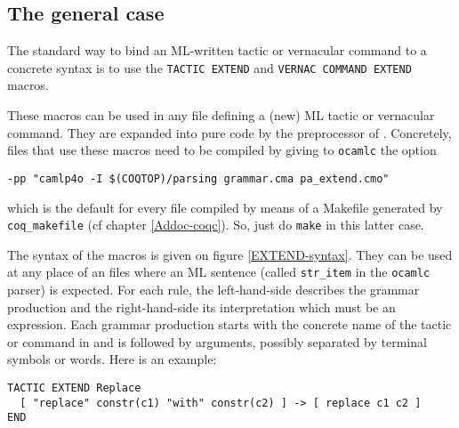 \subsection{The general case}

The standard way to bind an ML-written tactic or vernacular command to
a concrete {\Coq} syntax is to use the
\verb=TACTIC EXTEND= and \verb=VERNAC COMMAND EXTEND= macros.

These macros can be used in any {\ocaml} file defining a (new) ML tactic
or vernacular command. They are expanded into pure {\ocaml} code by
the {\camlpppp} preprocessor of {\ocaml}. Concretely, files that use
these macros need to be compiled by giving to {\tt ocamlc} the option 

\verb=-pp "camlp4o -I $(COQTOP)/parsing grammar.cma pa_extend.cmo"=

\noindent which is the default for every file compiled by means of a Makefile
generated by {\tt coq\_makefile} (cf chapter \ref {Addoc-coqc}). So,
just do \verb=make= in this latter case.

The syntax of the macros is given on figure
\ref{EXTEND-syntax}. They can be used at any place of an {\ocaml}
files where an ML sentence (called \verb=str_item= in the {\tt ocamlc}
parser) is expected. For each rule, the left-hand-side describes the
grammar production and the right-hand-side its interpretation which
must be an {\ocaml} expression. Each grammar production starts with
the concrete name of the tactic or command in {\Coq} and is followed
by arguments, possibly separated by terminal symbols or words.
Here is an example:

\begin{verbatim}
TACTIC EXTEND Replace
  [ "replace" constr(c1) "with" constr(c2) ] -> [ replace c1 c2 ]
END
\end{verbatim}

\newcommand{\grule}{\textrm{\textsl{rule}}}
\newcommand{\stritem}{\textrm{\textsl{ocaml\_str\_item}}}
\newcommand{\camlexpr}{\textrm{\textsl{ocaml\_expr}}}
\newcommand{\arginfo}{\textrm{\textsl{argument\_infos}}}
\newcommand{\lident}{\textrm{\textsl{lower\_ident}}}
\newcommand{\argument}{\textrm{\textsl{argument}}}
\newcommand{\entry}{\textrm{\textsl{entry}}}
\newcommand{\argtype}{\textrm{\textsl{argtype}}}

